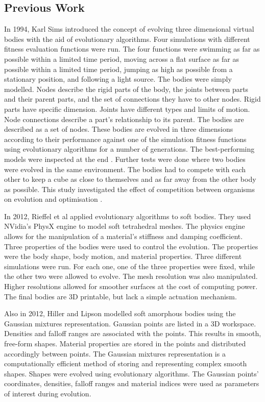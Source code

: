 \subsection{Previous Work}

In 1994, Karl Sims introduced the concept of evolving three dimensional virtual bodies with the aid of evolutionary algorithms. Four simulations with different fitness evaluation functions were run. The four functions were swimming as far as possible within a limited time period, moving across a flat surface as far as possible within a limited time period, jumping as high as possible from a stationary position, and following a light source. The bodies were simply modelled. Nodes describe the rigid parts of the body, the joints between parts and their parent parts, and the set of connections they have to other nodes. Rigid parts have specific dimension. Joints have different types and limits of motion. Node connections describe a part's relationship to its parent. The bodies are described as a set of nodes. These bodies are evolved in three dimensions according to their performance against one of the simulation fitness functions using evolutionary algorithms for a number of generations. The best-performing models were inspected at the end \cite{Sims1994a}. Further tests were done where two bodies were evolved in the same environment. The bodies had to compete with each other to keep a cube as close to themselves and as far away from the other body as possible. This study investigated the effect of competition between organisms on evolution and optimisation \cite{Sims1994b}.

In 2012, Rieffel et al applied evolutionary algorithms to soft bodies. They used NVidia's PhysX engine to model soft tetrahedral meshes. The physics engine allows for the manipulation of a material's stiffness and damping coefficient. Three properties of the bodies were used to control the evolution. The properties were the body shape, body motion, and material properties. Three different simulations were run. For each one, one of the three properties were fixed, while the other two were allowed to evolve. The mesh resolution was also manipulated. Higher resolutions allowed for smoother surfaces at the cost of computing power. The final bodies are 3D printable, but lack a simple actuation mechanism. \cite{Rieffel2013}

Also in 2012, Hiller and Lipson modelled soft amorphous bodies using the Gaussian mixtures representation. Gaussian points are listed in a 3D workspace. Densities and falloff ranges are associated with the points. This results in smooth, free-form shapes. Material properties are stored in the points and distributed accordingly between points. The Gaussian mixtures representation is a computationally efficient method of storing and representing complex smooth shapes. Shapes were evolved using evolutionary algorithms. The Gaussian points' coordinates, densities, falloff ranges and material indices were used as parameters of interest during evolution.\cite{Hiller2012}

